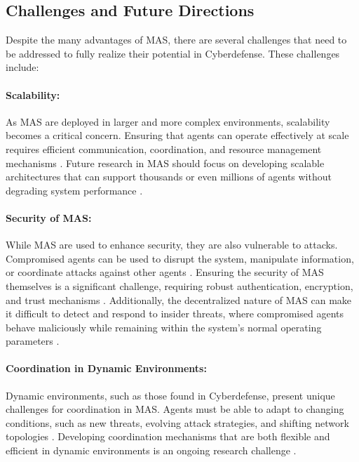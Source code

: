 \subsection{Challenges and Future Directions}

Despite the many advantages of MAS, there are several challenges that need to be addressed to fully realize their potential in Cyberdefense. These challenges include:

\paragraph{Scalability:}
As MAS are deployed in larger and more complex environments, scalability becomes a critical concern. Ensuring that agents can operate effectively at scale requires efficient communication, coordination, and resource management mechanisms \cite{buczak2016survey}. Future research in MAS should focus on developing scalable architectures that can support thousands or even millions of agents without degrading system performance \cite{buczak2016survey}.

\paragraph{Security of MAS:}
While MAS are used to enhance security, they are also vulnerable to attacks. Compromised agents can be used to disrupt the system, manipulate information, or coordinate attacks against other agents \cite{kolias2011swarm}. Ensuring the security of MAS themselves is a significant challenge, requiring robust authentication, encryption, and trust mechanisms \cite{kolias2011swarm}. Additionally, the decentralized nature of MAS can make it difficult to detect and respond to insider threats, where compromised agents behave maliciously while remaining within the system's normal operating parameters \cite{kolias2011swarm}.

\paragraph{Coordination in Dynamic Environments:}
Dynamic environments, such as those found in Cyberdefense, present unique challenges for coordination in MAS. Agents must be able to adapt to changing conditions, such as new threats, evolving attack strategies, and shifting network topologies \cite{kolias2011swarm}. Developing coordination mechanisms that are both flexible and efficient in dynamic environments is an ongoing research challenge \cite{kolias2011swarm}.

